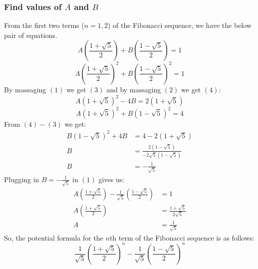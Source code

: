 \documentclass[12pt]{article}
\begin{document}
\subsubsection*{Find values of $A$ and $B$}
From the first two terms ($n=1,2$) of the Fibonacci sequence, we have the below pair of equations.
\setcounter{equation}{0}
\begin{equation}
	A \left( \frac{ 1+\sqrt{5} }{2} \right) + B \left( \frac{ 1-\sqrt{5} }{2} \right) = 1
\end{equation}
\begin{equation}
	A \left( \frac{ 1+\sqrt{5} }{2} \right)^2 + B \left( \frac{ 1-\sqrt{5} }{2} \right)^2 = 1
\end{equation}
By massaging $(1)$ we get $(3)$ and by massaging $(2)$ we get $(4)$:
\begin{equation}
	A(1+\sqrt{5})^2 -4B = 2(1 + \sqrt{5})
\end{equation}
\begin{equation}
	A(1+\sqrt{5})^2 + B(1 - \sqrt{5})^2 = 4
\end{equation}
From $(4)-(3)$ we get:
\begin{equation*}
	\begin{aligned}
		B(1 - \sqrt{5})^2 + 4B &= 4-2(1 + \sqrt{5})\\
		B &= \frac{ 2(1-\sqrt{5}) }{ -2\sqrt{5}(1-\sqrt{5}) }\\
		B &= -\frac{1}{\sqrt{5}}
	\end{aligned}
\end{equation*}
Plugging in $B = -\frac{1}{\sqrt{5}}$ in $(1)$ gives us:
\begin{equation*}
	\begin{aligned}
		A\left( \frac{1+\sqrt{5}}{2} \right) -\frac{1}{\sqrt{5}}\left( \frac{1-\sqrt{5}}{2} \right) &= 1\\
		A \left( \frac{1+\sqrt{5}}{2} \right) &= \frac{ 1+\sqrt{5} }{ 2\sqrt{5} }\\
		A &= \frac{1}{\sqrt{5}}
	\end{aligned}
\end{equation*}
So, the potential formula for the $n$th term of the Fibonacci sequence is as follows:
\[
	\frac{ 1 }{ \sqrt{5} } \left( \frac{ 1+\sqrt{5} }{2} \right)^n - \frac{1}{ \sqrt{5} } \left( \frac{1-\sqrt{5}}{2} \right)^n
\]
\end{document}

